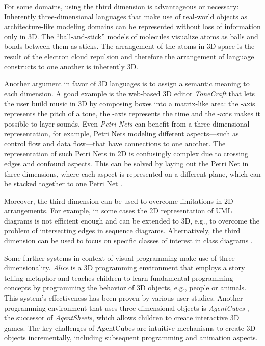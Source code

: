 \documentclass[a4paper]{article}
\begin{document}
For some domains, using the third dimension is advantageous or necessary: Inherently three-dimensional languages that make use of real-world objects as architecture-like modeling domains can be represented without loss of information only in 3D. The ``ball-and-stick'' models of molecules visualize atoms as balls and bonds between them as sticks. The arrangement of the atoms in 3D space is the result of the electron cloud repulsion and therefore the arrangement of language constructs to one another is inherently 3D.

Another argument in favor of 3D languages is to assign a semantic meaning to each dimension. A good example is the web-based 3D editor \emph{ToneCraft} \cite{tonecraft} that lets the user build music in 3D by composing boxes into a matrix-like area: the -axis represents the pitch of a tone, the -axis represents the time and the -axis makes it possible to layer sounds. Even \emph{Petri Nets} can benefit from a three-dimensional representation, for example, Petri Nets modeling different aspects---such as control flow and data flow---that have connections to one another. The representation of such Petri Nets in 2D is confusingly complex due to crossing edges and confound aspects. This can be solved by laying out the Petri Net in three dimensions, where each aspect is represented on a different plane, which can be stacked together to one Petri Net \cite{Roel07}.

Moreover, the third dimension can be used to overcome limitations in 2D arrangements. For example, in some cases the 2D representation of UML diagrams is not efficient enough and can be extended to 3D, e.g., to overcome the problem of intersecting edges in sequence diagrams. Alternatively, the third dimension can be used to focus on specific classes of interest in class diagrams \cite{GRR99}.

Some further systems in context of visual programming make use of three-dimensionality.
\emph{Alice} \cite{KP07} is a 3D programming environment that employs a story telling metaphor and teaches children to learn fundamental programming concepts by programming the behavior of 3D objects, e.g., people or animals. This system's effectiveness has been proven by various user studies. Another programming environment that uses three-dimensional objects is \emph{AgentCubes} \cite{IRW09}, the successor of \emph{AgentSheets}, which allows children to create interactive 3D games. The key challenges of AgentCubes are intuitive mechanisms to create 3D objects incrementally, including subsequent programming and animation aspects.
\end{document}
